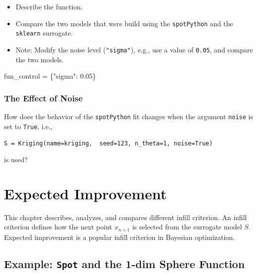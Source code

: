 \documentclass[
  letterpaper,
  DIV=11,
  numbers=noendperiod]{scrreprt}
\newenvironment{Shaded}{\begin{snugshade}}{\end{snugshade}}
\newcommand{\FloatTok}[1]{\textcolor[rgb]{0.68,0.00,0.00}{#1}}
\newcommand{\NormalTok}[1]{\textcolor[rgb]{0.00,0.23,0.31}{#1}}
\newcommand{\OperatorTok}[1]{\textcolor[rgb]{0.37,0.37,0.37}{#1}}
\newcommand{\StringTok}[1]{\textcolor[rgb]{0.13,0.47,0.30}{#1}}
\providecommand{\tightlist}{%
  \setlength{\itemsep}{0pt}\setlength{\parskip}{0pt}}\usepackage{longtable,booktabs,array}
\begin{document}
\begin{itemize}
\tightlist
\item
  Describe the function.
\item
  Compare the two models that were build using the \texttt{spotPython}
  and the \texttt{sklearn} surrogate.
\item
  Note: Modify the noise level (\texttt{"sigma"}), e.g., use a value of
  \texttt{0.05}, and compare the two models.
\end{itemize}

\begin{Shaded}
\begin{Highlighting}[]
\NormalTok{fun\_control }\OperatorTok{=}\NormalTok{ \{}\StringTok{"sigma"}\NormalTok{: }\FloatTok{0.05}\NormalTok{\}}
\end{Highlighting}
\end{Shaded}

\hypertarget{the-effect-of-noise}{%
\subsection{The Effect of Noise}\label{the-effect-of-noise}}

How does the behavior of the \texttt{spotPython} fit changes when the
argument \texttt{noise} is set to \texttt{True}, i.e.,

\texttt{S\ =\ Kriging(name=\textquotesingle{}kriging\textquotesingle{},\ \ seed=123,\ n\_theta=1,\ noise=True)}

is used?

\hypertarget{sec-expected-improvement}{%
\chapter{Expected Improvement}\label{sec-expected-improvement}}

This chapter describes, analyzes, and compares different infill
criterion. An infill criterion defines how the next point \(x_{n+1}\) is
selected from the surrogate model \(S\). Expected improvement is a
popular infill criterion in Bayesian optimization.

\hypertarget{example-spot-and-the-1-dim-sphere-function}{%
\section{\texorpdfstring{Example: \texttt{Spot} and the 1-dim Sphere
Function}{Example: Spot and the 1-dim Sphere Function}}\label{example-spot-and-the-1-dim-sphere-function}}
\end{document}
